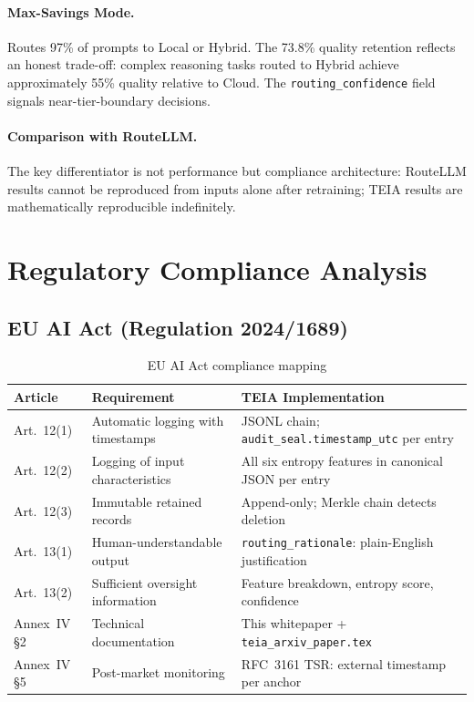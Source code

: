 \documentclass[11pt,a4paper]{article}
\newcommand{\teia}{\textsc{TEIA}}
\begin{document}
\paragraph{Max-Savings Mode.}
Routes 97\% of prompts to Local or Hybrid. The 73.8\% quality retention reflects
an honest trade-off: complex reasoning tasks routed to Hybrid achieve approximately
55\% quality relative to Cloud. The \texttt{routing\_confidence} field signals
near-tier-boundary decisions.

\paragraph{Comparison with RouteLLM.}
The key differentiator is not performance but compliance architecture: RouteLLM
results cannot be reproduced from inputs alone after retraining; \teia{} results
are mathematically reproducible indefinitely.

\section{Regulatory Compliance Analysis}
\label{sec:regulatory}

\subsection{EU AI Act (Regulation 2024/1689)}

\begin{table}[h]
\centering
\caption{EU AI Act compliance mapping}
\label{tab:euaiact}
\begin{tabular}{@{}p{2.4cm}p{4.2cm}p{5.2cm}@{}}
\toprule
Article & Requirement & \teia{} Implementation \\
\midrule
Art.~12(1) & Automatic logging with timestamps &
  JSONL chain; \texttt{audit\_seal.timestamp\_utc} per entry \\[2pt]
Art.~12(2) & Logging of input characteristics &
  All six entropy features in canonical JSON per entry \\[2pt]
Art.~12(3) & Immutable retained records &
  Append-only; Merkle chain detects deletion \\[2pt]
Art.~13(1) & Human-understandable output &
  \texttt{routing\_rationale}: plain-English justification \\[2pt]
Art.~13(2) & Sufficient oversight information &
  Feature breakdown, entropy score, confidence \\[2pt]
Annex~IV \S2 & Technical documentation &
  This whitepaper + \texttt{teia\_arxiv\_paper.tex} \\[2pt]
Annex~IV \S5 & Post-market monitoring &
  RFC~3161 TSR: external timestamp per anchor \\
\bottomrule
\end{tabular}
\end{table}
\end{document}

